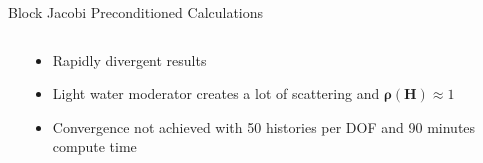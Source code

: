 \documentclass{beamer}
\begin{document}
\begin{frame}{Block Jacobi Preconditioned Calculations}
\begin{columns}
\begin{column}{0.5\textwidth}
    \end{column}

    \begin{column}{0.5\textwidth}
      \begin{itemize}
      \item Rapidly divergent results
        \medskip
      \item Light water moderator creates a lot of scattering and
        $\mathbf{\rho}(\mathbf{H}) \approx 1$
        \medskip
      \item Convergence not achieved with 50 histories per DOF and 90
        minutes compute time
      \end{itemize}
    \end{column}

  \end{columns}

\end{frame}
\end{document}
